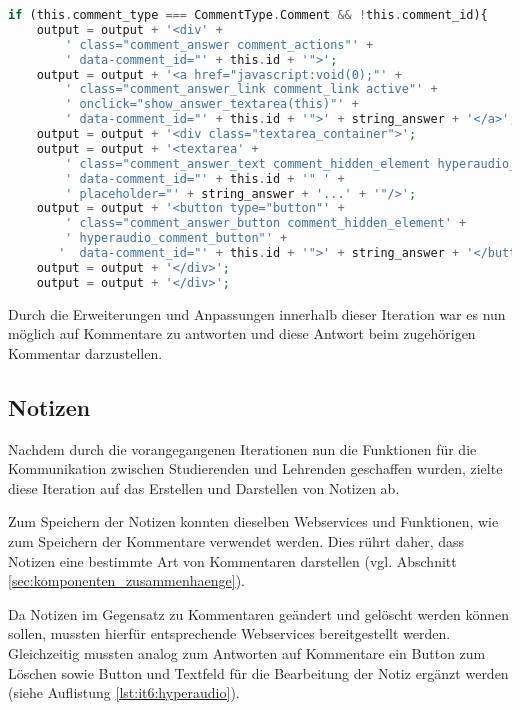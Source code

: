 \begin{lstlisting}[language=php,
             linewidth=\textwidth,
             caption={Ausschnitt der \textbf{hyperaudio.js} in der 5. Iteration},
             label={lst:it5:hyperaudio}]
if (this.comment_type === CommentType.Comment && !this.comment_id){
    output = output + '<div' +
        ' class="comment_answer comment_actions"' +
        ' data-comment_id="' + this.id + '">';
    output = output + '<a href="javascript:void(0);"' +
        ' class="comment_answer_link comment_link active"' +
        ' onclick="show_answer_textarea(this)"' +
        ' data-comment_id="' + this.id + '">' + string_answer + '</a>';
    output = output + '<div class="textarea_container">';
    output = output + '<textarea' +
        ' class="comment_answer_text comment_hidden_element hyperaudio_textarea"' +
        ' data-comment_id="' + this.id + '" ' + 
        ' placeholder="' + string_answer + '...' + '"/>';
    output = output + '<button type="button"' +
        ' class="comment_answer_button comment_hidden_element' +
        ' hyperaudio_comment_button"' +
       '  data-comment_id="' + this.id + '">' + string_answer + '</button>';
    output = output + '</div>';
    output = output + '</div>';
\end{lstlisting}

Durch die Erweiterungen und Anpassungen innerhalb dieser Iteration war es nun möglich auf Kommentare zu antworten und diese Antwort beim zugehörigen Kommentar darzustellen.

\subsection{Notizen}
\label{sub:notizen}
Nachdem durch die vorangegangenen Iterationen nun die Funktionen für die Kommunikation zwischen Studierenden und Lehrenden geschaffen wurden, zielte diese Iteration auf das Erstellen und Darstellen von Notizen ab.

Zum Speichern der Notizen konnten dieselben Webservices und Funktionen, wie zum Speichern der Kommentare verwendet werden. Dies rührt daher, dass Notizen eine bestimmte Art von Kommentaren darstellen (vgl. Abschnitt \ref{sec:komponenten_zusammenhaenge}). 

Da Notizen im Gegensatz zu Kommentaren geändert und gelöscht werden können sollen, mussten hierfür entsprechende Webservices bereitgestellt werden. Gleichzeitig mussten analog zum Antworten auf Kommentare ein Button zum Löschen sowie Button und Textfeld für die Bearbeitung der Notiz ergänzt werden (siehe Auflistung \ref{lst:it6:hyperaudio}). 

